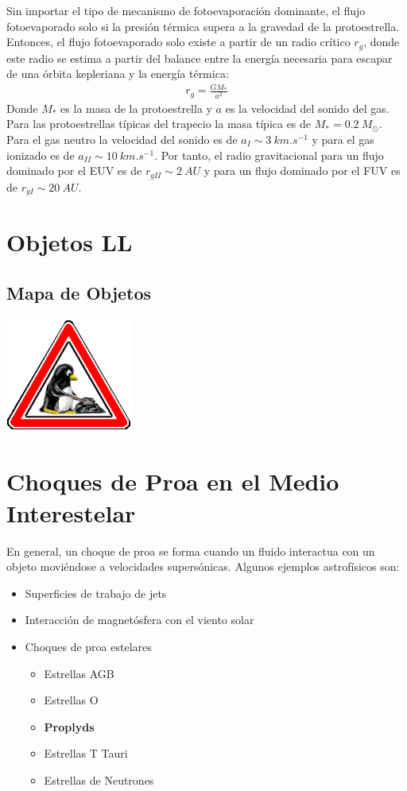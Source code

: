 Sin importar el tipo de mecanismo de fotoevaporación dominante, el flujo fotoevaporado solo si la presión térmica supera a la gravedad de la protoestrella. Entonces, el flujo fotoevaporado solo existe a partir de un radio crítico $r_g$, donde este radio se estima a partir del balance entre la energía necesaria para escapar de una órbita kepleriana y la energía térmica:
\begin{align}
  r_g = \frac{GM_*}{a^2}
\end{align}
Donde $M_*$ es la masa de la protoestrella y $a$ es la velocidad del sonido del gas. Para las protoestrellas típicas del trapecio la masa típica es de
$M_* = 0.2~M_\odot$. Para el gas neutro la velocidad del sonido es de $a_I \sim \SI{3}{km.s^{-1}}$ y para el gas ionizado es de $a_{II} \sim \SI{10}{km.s^{-1}}$.
Por tanto, el radio gravitacional para un flujo dominado por el EUV es de $r_{gII} \sim \SI{2}{AU}$ y para un flujo dominado por el FUV es de $r_{gI} \sim \SI{20}{AU}$.
\section{Objetos LL}
\subsection{Mapa de Objetos}

\includegraphics[width=0.1\linewidth]{./Figures/tux-development}

\section{Choques de Proa en el Medio Interestelar}

En general, un choque de proa se forma cuando un fluido interactua con un objeto moviéndose a velocidades supersónicas. Algunos ejemplos astrofísicos son:

\begin{itemize}
\item Superficies de trabajo de jets
\item Interacción de magnetósfera con el viento solar
\item Choques de proa estelares
  \begin{itemize}
  \item Estrellas AGB
  \item Estrellas O
  \item \textbf{Proplyds}
  \item Estrellas T Tauri
  \item Estrellas de Neutrones
  \end{itemize}
\end{itemize}

